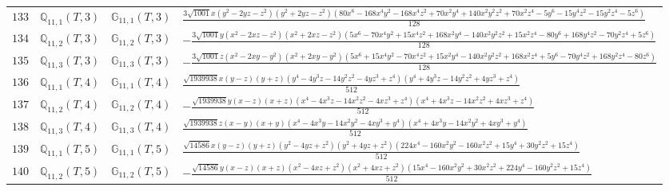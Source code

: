\documentclass[fleqn,8pt,landscape]{jsarticle}
\begin{document}
\begin{table}[ht!]
\begin{center}
\begin{tabular}{cccl}
$ 133 $ & $ \mathbb{Q}_{11,1}(T,3) $ & $ \mathbb{G}_{11,1}(T,3) $ & $ \frac{3 \sqrt{1001} x \left(y^{2} - 2 y z - z^{2}\right) \left(y^{2} + 2 y z - z^{2}\right) \left(80 x^{6} - 168 x^{4} y^{2} - 168 x^{4} z^{2} + 70 x^{2} y^{4} + 140 x^{2} y^{2} z^{2} + 70 x^{2} z^{4} - 5 y^{6} - 15 y^{4} z^{2} - 15 y^{2} z^{4} - 5 z^{6}\right)}{128} $ \\
$ 134 $ & $ \mathbb{Q}_{11,2}(T,3) $ & $ \mathbb{G}_{11,2}(T,3) $ & $ - \frac{3 \sqrt{1001} y \left(x^{2} - 2 x z - z^{2}\right) \left(x^{2} + 2 x z - z^{2}\right) \left(5 x^{6} - 70 x^{4} y^{2} + 15 x^{4} z^{2} + 168 x^{2} y^{4} - 140 x^{2} y^{2} z^{2} + 15 x^{2} z^{4} - 80 y^{6} + 168 y^{4} z^{2} - 70 y^{2} z^{4} + 5 z^{6}\right)}{128} $ \\
$ 135 $ & $ \mathbb{Q}_{11,3}(T,3) $ & $ \mathbb{G}_{11,3}(T,3) $ & $ - \frac{3 \sqrt{1001} z \left(x^{2} - 2 x y - y^{2}\right) \left(x^{2} + 2 x y - y^{2}\right) \left(5 x^{6} + 15 x^{4} y^{2} - 70 x^{4} z^{2} + 15 x^{2} y^{4} - 140 x^{2} y^{2} z^{2} + 168 x^{2} z^{4} + 5 y^{6} - 70 y^{4} z^{2} + 168 y^{2} z^{4} - 80 z^{6}\right)}{128} $ \\
$ 136 $ & $ \mathbb{Q}_{11,1}(T,4) $ & $ \mathbb{G}_{11,1}(T,4) $ & $ \frac{\sqrt{1939938} x \left(y - z\right) \left(y + z\right) \left(y^{4} - 4 y^{3} z - 14 y^{2} z^{2} - 4 y z^{3} + z^{4}\right) \left(y^{4} + 4 y^{3} z - 14 y^{2} z^{2} + 4 y z^{3} + z^{4}\right)}{512} $ \\
$ 137 $ & $ \mathbb{Q}_{11,2}(T,4) $ & $ \mathbb{G}_{11,2}(T,4) $ & $ - \frac{\sqrt{1939938} y \left(x - z\right) \left(x + z\right) \left(x^{4} - 4 x^{3} z - 14 x^{2} z^{2} - 4 x z^{3} + z^{4}\right) \left(x^{4} + 4 x^{3} z - 14 x^{2} z^{2} + 4 x z^{3} + z^{4}\right)}{512} $ \\
$ 138 $ & $ \mathbb{Q}_{11,3}(T,4) $ & $ \mathbb{G}_{11,3}(T,4) $ & $ \frac{\sqrt{1939938} z \left(x - y\right) \left(x + y\right) \left(x^{4} - 4 x^{3} y - 14 x^{2} y^{2} - 4 x y^{3} + y^{4}\right) \left(x^{4} + 4 x^{3} y - 14 x^{2} y^{2} + 4 x y^{3} + y^{4}\right)}{512} $ \\
$ 139 $ & $ \mathbb{Q}_{11,1}(T,5) $ & $ \mathbb{G}_{11,1}(T,5) $ & $ \frac{\sqrt{14586} x \left(y - z\right) \left(y + z\right) \left(y^{2} - 4 y z + z^{2}\right) \left(y^{2} + 4 y z + z^{2}\right) \left(224 x^{4} - 160 x^{2} y^{2} - 160 x^{2} z^{2} + 15 y^{4} + 30 y^{2} z^{2} + 15 z^{4}\right)}{512} $ \\
$ 140 $ & $ \mathbb{Q}_{11,2}(T,5) $ & $ \mathbb{G}_{11,2}(T,5) $ & $ - \frac{\sqrt{14586} y \left(x - z\right) \left(x + z\right) \left(x^{2} - 4 x z + z^{2}\right) \left(x^{2} + 4 x z + z^{2}\right) \left(15 x^{4} - 160 x^{2} y^{2} + 30 x^{2} z^{2} + 224 y^{4} - 160 y^{2} z^{2} + 15 z^{4}\right)}{512} $ \\

\end{tabular}
\end{center}
\end{table}
\end{document}
